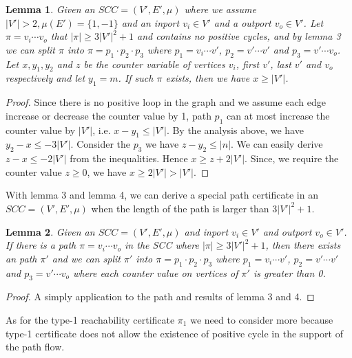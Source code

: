 \documentclass{article}
\newtheorem{lemma}{Lemma}
\newtheorem{proof}{\textit{Proof}}
\begin{document}
\begin{itemize}
\begin{lemma}
Given an $SCC = (V', E', \mu)$ where we assume $|V'| > 2, \mu(E')= \{1,-1\}$ and an inport $v_i\in V'$ and a outport $v_o \in V'$. Let $\pi = v_i\cdots v_o$ that $|\pi| \ge 3|V'|^2 + 1$ and contains no positive cycles, and by lemma 3 we can split $\pi$ into $\pi = p_1\cdot p_2 \cdot p_3$ where $p_1 = v_i\cdots v'$, $p_2 = v'\cdots v'$ and $p_3 = v'\cdots v_o$. Let $x,y_1,y_2$ and $z$ be the counter variable of vertices $v_i$, first $v'$, last $v'$ and $v_o$ respectively and let $y_1 = m$. If such $\pi$ exists, then we have $x\ge |V'|$.



\end{lemma}


\begin{proof}
Since there is no positive loop in the graph and we assume each edge increase or decrease the counter value by 1, path $p_1$ can at most increase the counter value by $|V'|$, i.e. $x - y_1 \le |V'|$. By the analysis above, we have $y_2 - x \le -3|V'|$. Consider the $p_3$ we have $z - y_2 \le |n|$. We can easily derive $z - x \le -2|V'|$ from the inequalities. Hence $x \ge z + 2|V'|$. Since, we require the counter value $z\ge 0$, we have $x \ge 2|V'| > |V'|$.




\end{proof}

With lemma 3 and lemma 4, we can derive a special path certificate in an  $SCC = (V', E', \mu)$ when the length of the path is larger than $3|V'|^2 + 1$.

\begin{lemma}
Given an $SCC = (V', E', \mu)$ and inport $v_i\in V'$ and outport $v_o\in V'$. If there is a path $\pi = v_i\cdots v_o$ in the SCC where $|\pi| \ge 3|V'|^2 + 1$, then there exists an path $\pi'$ and we can split $\pi'$ into $\pi = p_1\cdot p_2 \cdot p_3$ where $p_1 = v_i\cdots v'$, $p_2 = v'\cdots v'$ and $p_3 = v'\cdots v_o$ where each counter value on vertices of $\pi'$ is greater than 0.


\end{lemma}


\begin{proof}
A simply application to the path and results of lemma 3 and 4.
\end{proof}


As for the type-1 reachability certificate $\pi_1$ we need to consider more because type-1 certificate does not allow the existence of positive cycle in the support of the path flow.



\end{itemize}
\end{document}
